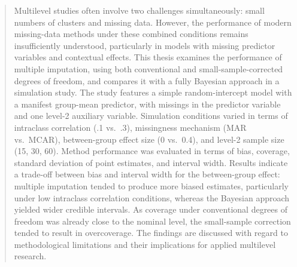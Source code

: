 \documentclass[
  letterpaper,
  11pt,
  english,
  singlespacing,
  headsepline,
  openany]{MastersDoctoralThesis}
\begin{document}



\begin{abstract}
\addchaptertocentry{\abstractname} %
Multilevel studies often involve two challenges simultaneously: small
numbers of clusters and missing data. However, the performance of modern
missing-data methods under these combined conditions remains
insufficiently understood, particularly in models with missing predictor
variables and contextual effects. This thesis examines the performance
of multiple imputation, using both conventional and
small-sample-corrected degrees of freedom, and compares it with a fully
Bayesian approach in a simulation study. The study features a simple
random-intercept model with a manifest group-mean predictor, with
missings in the predictor variable and one level-2 auxiliary variable.
Simulation conditions varied in terms of intraclass correlation (.1
vs.~.3), missingness mechanism (MAR vs.~MCAR), between-group effect size
(0 vs.~0.4), and level-2 sample size (15, 30, 60). Method performance
was evaluated in terms of bias, coverage, standard deviation of point
estimates, and interval width. Results indicate a trade-off between bias
and interval width for the between-group effect: multiple imputation
tended to produce more biased estimates, particularly under low
intraclass correlation conditions, whereas the Bayesian approach yielded
wider credible intervals. As coverage under conventional degrees of
freedom was already close to the nominal level, the small-sample
correction tended to result in overcoverage. The findings are discussed
with regard to methodological limitations and their implications for
applied multilevel research.
\end{abstract}



% 

\begingroup
\hypersetup{linkcolor=black}

\tableofcontents %

\listoffigures %

\listoftables %
\end{document}
